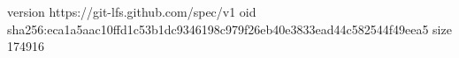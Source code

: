 version https://git-lfs.github.com/spec/v1
oid sha256:eca1a5aac10ffd1c53b1dc9346198c979f26eb40e3833ead44c582544f49eea5
size 174916
